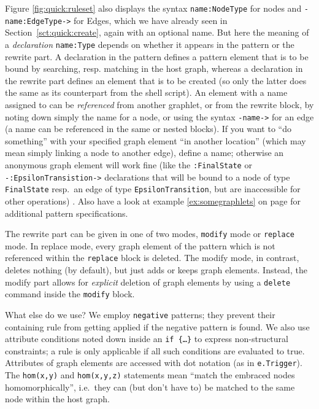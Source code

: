 Figure \ref{fig:quick:ruleset} also displays the syntax \texttt{name:NodeType} for nodes and \texttt{-name:EdgeType->} for Edges, which we have already seen in Section~\ref{sct:quick:create}, again with an optional name.
But here the meaning of a \emph{declaration} \texttt{name:Type} depends on whether it appears in the pattern or the rewrite part.
A declaration in the pattern defines a pattern element that is to be bound by searching, resp. matching in the host graph, whereas a declaration in the rewrite part defines an element that is to be created (so only the latter does the same as its counterpart from the shell script).
An element with a name assigned to can be \emph{referenced} from another graphlet, or from the rewrite block, by noting down simply the name for a node, or using the syntax \texttt{-name->} for an edge (a name can be referenced in the same or nested blocks).
If you want to ``do something'' with your specified graph element ``in another location'' (which may mean simply linking a node to another edge), define a name; otherwise an anonymous graph element will work fine (like the \texttt{:FinalState} or \texttt{-:EpsilonTransistion->} declarations that will be bound to a node of type \texttt{FinalState} resp.\ an edge of type \texttt{EpsilonTransition}, but are inaccessible for other operations) .
Also have a look at example \ref{ex:somegraphlets} on page \pageref{ex:somegraphlets} for additional pattern specifications.

The rewrite part can be given in one of two modes, \texttt{modify} mode or \texttt{replace} mode.
In replace mode, every graph element of the pattern which is not referenced within the \texttt{replace} block is deleted.
The modify mode, in contrast, deletes nothing (by default), but just adds or keeps graph elements.
Instead, the modify part allows for \emph{explicit} deletion of graph elements by using a \texttt{delete} command inside the \texttt{modify} block.

What else do we use?
We employ \texttt{negative} patterns; they prevent their containing rule from getting applied if the negative pattern is found.
We also use attribute conditions noted down inside an \texttt{if \{\dots\}} to express non-structural constraints; a rule is only applicable if all such conditions are evaluated to true.
Attributes of graph elements are accessed with dot notation (as in \texttt{e.Trigger}).
The \texttt{hom(x,y)} and \texttt{hom(x,y,z)} statements mean ``match the embraced nodes homomorphically'', i.e.\ they can (but don't have to) be matched to the same node within the host graph.

